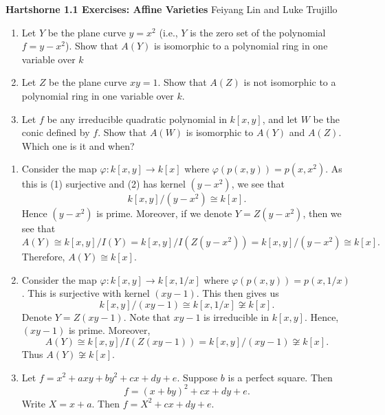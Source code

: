 \documentclass{hw_pset} %
\renewcommand{\phi}{\varphi}
\newcommand{\header}[2]{
    {\noindent
    {\Large \bf Hartshorne #1 Exercises: #2}
    \hfill 
    {\large Feiyang Lin and Luke Trujillo}
    \vspace{0.5cm}}
}
\begin{document}
\header{1.1}{Affine Varieties}
    
\begin{exercise}[1.1]
    \begin{enumerate}
        \item Let $Y$ be the plane curve $y = x^2$ (i.e., $Y$ is the zero set of 
        the polynomial $f = y - x^2$). Show that $A(Y)$ is isomorphic to a polynomial ring 
        in one variable over $k$

        \item Let $Z$ be the plane curve $xy = 1$. Show that $A(Z)$ is not isomorphic to 
        a polynomial ring in one variable over $k$. 
        
        \item Let $f$ be any irreducible quadratic polynomial in $k[x, y]$, and let 
        $W$ be the conic defined by $f$. Show that $A(W)$ is isomorphic to $A(Y)$ and $A(Z)$.
        Which one is it and when? 
    \end{enumerate}
\end{exercise}

\begin{solution}
    \begin{enumerate}
        \item Consider the map $\phi: k[x, y] \to k[x]$ where $\phi(p(x, y)) = p(x, x^2)$. 
        As this is (1) surjective and (2) has kernel $(y - x^2)$, we see that 
        \[
            k[x, y]/(y - x^2) \cong k[x].
        \]
        Hence $(y - x^2)$ is prime. Moreover, if we denote 
        $Y = Z(y - x^2)$, then we see that
        \[
            A(Y) \cong k[x, y]/I(Y) = k[x, y]/I(Z(y - x^2)) = k[x, y]/(y - x^2)
            \cong k[x].
        \]
        Therefore, $A(Y) \cong k[x]$. 

        \item Consider the map 
        $\phi: k[x, y] \to k[x, 1/x]$ where $\phi(p(x, y)) = p(x, 1/x)$. This 
        is surjective with kernel $(xy - 1)$. This then gives us 
        \[
            k[x, y]/(xy - 1) \cong k[x, 1/x] \not\cong k[x].
        \]
        Denote $Y = Z(xy - 1)$. Note that $xy - 1$ is irreducible in $k[x, y]$. 
        Hence, $(xy - 1)$ is prime. Moreover, 
        \[
            A(Y) \cong k[x, y]/I(Z(xy - 1)) = k[x, y]/(xy - 1)\not\cong k[x].
        \]
        Thus $A(Y) \not\cong k[x]$. 

        \item Let $f = x^2 + axy + by^2 + cx + dy + e$. 
        Suppose $b$ is a perfect square. Then 
        \[
            f = (x + by)^2 + cx + dy + e.
        \]
        Write $X = x + a$. Then $f = X^2 + cx + dy +e$. 
    \end{enumerate}
\end{solution}
\end{document}
